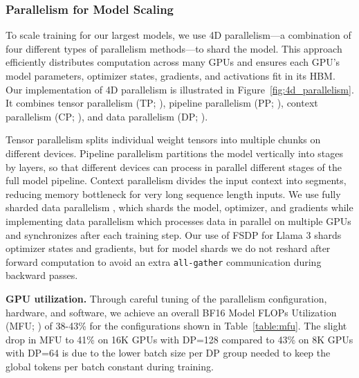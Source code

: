 \subsubsection{Parallelism for Model Scaling}
\label{section:4D-parallelism}

To scale training for our largest models, we use 4D parallelism—a combination of four different types of parallelism methods—to shard the model. This approach efficiently distributes computation across many GPUs and ensures each GPU's model parameters, optimizer states, gradients, and activations fit in its HBM. Our implementation of 4D parallelism is illustrated in Figure~\ref{fig:4d_parallelism}. It combines tensor parallelism (TP; \citet{NIPS2012_c399862d, shoeybi2019megatron, korthikanti2023reducing}), pipeline parallelism (PP; \citet{huang2019gpipe, narayanan2021efficient, lamy2023breadth}), context parallelism (CP; \citet{liu2023ring}), and data parallelism (DP; \citet{rajbhandari2020zeromemoryoptimizationstraining, ren2021zerooffloaddemocratizingbillionscalemodel, zhao2023pytorch}).

Tensor parallelism splits individual weight tensors into multiple chunks on different devices. Pipeline parallelism partitions the model vertically into stages by layers, so that different devices can process in parallel different stages of the full model pipeline. Context parallelism divides the input context into segments, reducing memory bottleneck for very long sequence length inputs. We use fully sharded data parallelism \citep[FSDP;][]{rajbhandari2020zeromemoryoptimizationstraining, ren2021zerooffloaddemocratizingbillionscalemodel, zhao2023pytorch}, which shards the model, optimizer, and gradients while implementing data parallelism which processes data in parallel on multiple GPUs and synchronizes after each training step. Our use of FSDP for Llama 3 shards optimizer states and gradients, but for model shards we do not reshard after forward computation to avoid an extra \texttt{all-gather} communication during backward passes.

\textbf{GPU utilization.} Through careful tuning of the parallelism configuration, hardware, and software, we achieve an overall BF16 Model FLOPs Utilization (MFU; \citet{chowdhery2023palm}) of 38-43\% for the configurations shown in Table~\ref{table:mfu}.  The slight drop in MFU to 41\% on 16K GPUs with DP=128 compared to 43\% on 8K GPUs with DP=64 is due to the lower batch size per DP group needed to keep the global tokens per batch constant during training.

